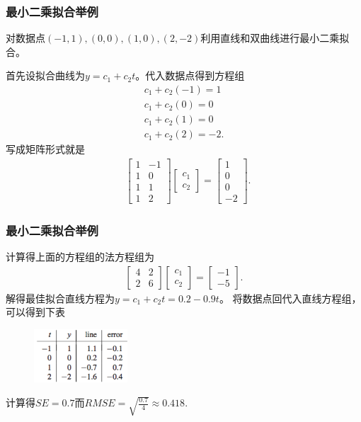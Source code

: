\documentclass[10pt]{beamer}
\begin{document}
\begin{frame}
\frametitle{最小二乘拟合举例}
\begin{example}
对数据点$(-1,1), (0,0), (1,0), (2, -2)$利用直线和双曲线进行最小二乘拟合。
\end{example}
首先设拟合曲线为$y = c_1 + c_2 t$。代入数据点得到方程组
\begin{align}
c_1 + c_2 (-1) = 1 \nonumber \\
c_1 + c_2 (0) = 0 \nonumber \\
c_1 + c_2 (1) = 0 \nonumber \\
c_1 + c_2 (2) = -2.
\end{align}
写成矩阵形式就是
\begin{align}
&\left[ \begin{array}{cc}
     1    & -1 \\
     1    &   0 \\
     1    & 1  \\
     1    & 2                       
            \end{array} \right] 
\left[ \begin{array}{c} 
      c_1 \\ c_2 \end{array} \right] 
=
\left[ \begin{array}{c}
      1 \\ 0 \\ 0  \\ -2  \end{array} \right] .
\end{align}
\end{frame}


\begin{frame}
\frametitle{最小二乘拟合举例}
计算得上面的方程组的法方程组为
\begin{align}
\left[ \begin{array}{cc}
     4    & 2 \\
     2    &   6                 
            \end{array} \right] 
\left[ \begin{array}{c} 
      c_1 \\ c_2 \end{array} \right] 
=
\left[ \begin{array}{c}
      -1 \\ -5   \end{array} \right] .
\end{align}
解得最佳拟合直线方程为$y = c_1 + c_2t = 0.2 - 0.9t$。
将数据点回代入直线方程组，可以得到下表
\begin{figure}
\includegraphics[width=3.5cm]{figs/4-1-2_Fitting_Data-4} 
\end{figure}
计算得$SE = 0.7$而$RMSE = \sqrt{\frac{0.7}{4}} \approx 0.418$.
\end{frame}
\end{document}
